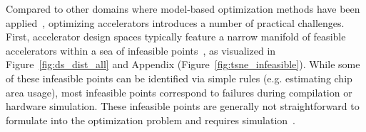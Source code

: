  Compared to other domains where model-based optimization methods have been applied~\citep{brookes19a,trabucco2021conservative}, optimizing accelerators introduces a number of practical challenges.
%
First, accelerator design spaces typically feature a narrow manifold of feasible accelerators within a sea of infeasible points~\citep{prac_dse:mascots:2019,shi2020learned,gelbart2014bayesian}, as visualized in Figure~\ref{fig:ds_dist_all} and Appendix (Figure~\ref{fig:tsne_infeasible}).
%
While some of these infeasible points can be identified via simple rules (e.g. estimating chip area usage), most infeasible points correspond to failures during compilation or hardware simulation. These infeasible points are generally not straightforward to formulate into the optimization problem and requires simulation~\citep{shi2020learned,timeloop,yazdanbakhsh2021apollo}.




%

